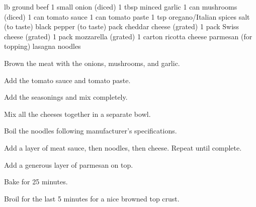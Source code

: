 \dishtype{\main}
\dishother{}
\begin{ingreds}
     lb ground beef
        1 small onion (diced)
        1 tbsp minced garlic
        1 can mushrooms (diced)
        1 can tomato sauce
        1 can tomato paste
        1 tsp oregano/Italian spices
        salt (to taste)
        black pepper (to taste)
    \columnbreak{}
     pack cheddar cheese (grated)
        1 pack Swiss cheese (grated)
        1 pack mozzarella (grated)
        1 carton ricotta cheese
    \ingredients[Extra]
        parmesan (for topping)
        lasagna noodles
\end{ingreds}
\begin{method}
    Brown the meat with the onions, mushrooms, and garlic.\par
    Add the tomato sauce and tomato paste.\par
    Add the seasonings and mix completely.\par
    Mix all the cheeses together in a separate bowl.\par
    Boil the noodles following manufacturer's specifications.\par
    Add a layer of meat sauce, then noodles, then cheese. Repeat until complete.\par
    Add a generous layer of parmesan on top.\par
    Bake for 25 minutes.\par
    Broil for the last 5 minutes for a nice browned top crust.
\end{method}